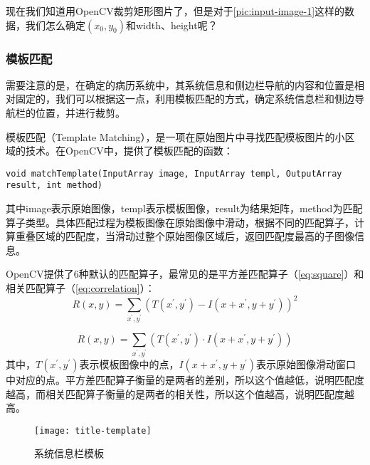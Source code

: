 现在我们知道用OpenCV裁剪矩形图片了，但是对于\autoref{pic:input-image-1}这样的数据，我们怎么确定$(x_0,y_0)$和width、height呢？

\subsubsection*{模板匹配}
需要注意的是，在确定的病历系统中，其系统信息和侧边栏导航的内容和位置是相对固定的，我们可以根据这一点，利用模板匹配的方式，确定系统信息栏和侧边导航栏的位置，并进行裁剪。

模板匹配（Template Matching）\citep{template-matching}，是一项在原始图片中寻找匹配模板图片的小区域的技术。在OpenCV中，提供了模板匹配的函数：
\begin{lstlisting}
void matchTemplate(InputArray image, InputArray templ, OutputArray result, int method)
\end{lstlisting}
其中image表示原始图像，templ表示模板图像，result为结果矩阵，method为匹配算子类型。具体匹配过程为模板图像在原始图像中滑动，根据不同的匹配算子，计算重叠区域的匹配度，当滑动过整个原始图像区域后，返回匹配度最高的子图像信息。

OpenCV提供了6种默认的匹配算子，最常见的是平方差匹配算子（\autoref{eq:square}）和相关匹配算子（\autoref{eq:correlation}）：
\begin{equation} \label{eq:square}
R(x,y)=\sum_{x^{'},y^{'}}(T(x^{'},y^{'})-I(x+x^{'},y+y^{'}))^2
\end{equation}

\begin{equation} \label{eq:correlation}
R(x,y)=\sum_{x^{'},y^{'}}(T(x^{'},y^{'})\cdot I(x+x^{'},y+y^{'}))
\end{equation}
其中，$T(x^{'},y^{'})$表示模板图像中的点，$I(x+x^{'},y+y^{'})$表示原始图像滑动窗口中对应的点。平方差匹配算子衡量的是两者的差别，所以这个值越低，说明匹配度越高，而相关匹配算子衡量的是两者的相关性，所以这个值越高，说明匹配度越高。

\begin{figure}
	\centering
	\caption{系统信息栏模板}
	\texttt{[image: title-template]}
	\label{pic:title-template}
\end{figure}

